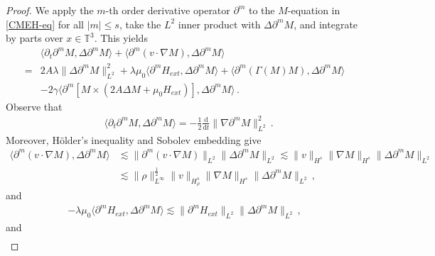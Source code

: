 \documentclass[reqno,11pt]{amsart}
\numberwithin{equation}{section}
\def\d{\mathrm{d}}
\begin{document}
\begin{proof}

We apply the $m$-th order derivative operator $\partial^m$ to the $M$-equation in \eqref{CMEH-eq} for all $|m| \leq s$, take the $L^2$ inner product with $\Delta \partial^{m} M$, and integrate by parts over $x \in \mathbb{T}^3$. This yields
\begin{equation}\label{M-eq1}
	\begin{aligned}
& \langle \partial_t \partial^m M, \Delta \partial^m M \rangle + \langle \partial^m (v \cdot \nabla M), \Delta \partial^m M \rangle  \\
= & 2A\lambda \|\Delta \partial^m M\|_{L^2}^2 + \lambda \mu_0 \langle \partial^m H_{ext}, \Delta \partial^m M \rangle + \langle \partial^m (\Gamma(M) M), \Delta \partial^m M \rangle  \\
& - 2 \gamma\langle \partial^m \left[ M \times (2A\Delta M + \mu_0 H_{ext}) \right], \Delta \partial^m M \rangle  
\,.
	\end{aligned}
\end{equation}
Observe that
\begin{equation}\label{M-eq2}
	\begin{aligned}
&\langle \partial_t \partial^m M, \Delta \partial^m M \rangle = -\frac{1}{2} \frac{\d}{\d t} \|\nabla \partial^m M\|_{L^2}^2 
\,.
	\end{aligned}
\end{equation}
Moreover, H\"older's inequality and Sobolev embedding give
\begin{equation}\label{M-eq3}
	\begin{aligned}
\langle \partial^m (v \cdot \nabla M), \Delta \partial^m M \rangle &\lesssim \|\partial^m (v \cdot \nabla M)\|_{L^2} \|\Delta \partial^m M\|_{L^2} \lesssim \|v\|_{H^s} \|\nabla M\|_{H^s} \|\Delta \partial^m M\|_{L^2}\\
& \lesssim \|\rho\|_{L^\infty}^\frac{1}{2} \|v\|_{H^s_\rho} \|\nabla M\|_{H^s} \|\Delta \partial^m M\|_{L^2} \,,
	\end{aligned}
\end{equation}
and
\begin{equation}\label{M-eq4}
	\begin{aligned}
-\lambda\mu_0 \langle \partial^m H_{ext}, \Delta \partial^m M \rangle \lesssim \|\partial^m H_{ext}\|_{L^2} \|\Delta \partial^m M\|_{L^2} \,,
	\end{aligned}
\end{equation}
and
\begin{equation}\label{M-eq5}
	\begin{aligned}

\end{aligned}
\end{equation}
\end{proof}
\end{document}
